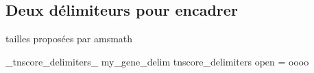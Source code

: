 \documentclass[12pt, a4paper]{article}
\begin{document}
\subsection{Deux délimiteurs pour encadrer}

tailles proposées par amsmath
\ExplSyntaxOn

\DeclareInstance
    {_tnscore_delimiters_}
    {my_gene_delim}
    {tnscore_delimiters}
    {
        open = oooo
    }


\ExplSyntaxOff
\end{document}
